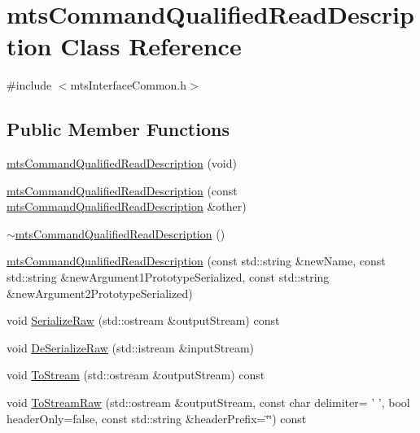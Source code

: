 \hypertarget{classmts_command_qualified_read_description}{\section{mts\-Command\-Qualified\-Read\-Description Class Reference}
\label{classmts_command_qualified_read_description}
}


{\ttfamily \#include $<$mts\-Interface\-Common.\-h$>$}

\subsection*{Public Member Functions}
\begin{DoxyCompactItemize}
\item 
\hyperlink{classmts_command_qualified_read_description_ac1bbc0907aacbcba29c705be7a3d6040}{mts\-Command\-Qualified\-Read\-Description} (void)
\item 
\hyperlink{classmts_command_qualified_read_description_aa84e9217fd8e3ae9293a86a5f10e7024}{mts\-Command\-Qualified\-Read\-Description} (const \hyperlink{classmts_command_qualified_read_description}{mts\-Command\-Qualified\-Read\-Description} \&other)
\item 
\hyperlink{classmts_command_qualified_read_description_abe7e0823d8277340b167b1c621155b8e}{$\sim$mts\-Command\-Qualified\-Read\-Description} ()
\item 
\hyperlink{classmts_command_qualified_read_description_a85a636e73cab699ebbcea28f5cfc9785}{mts\-Command\-Qualified\-Read\-Description} (const std\-::string \&new\-Name, const std\-::string \&new\-Argument1\-Prototype\-Serialized, const std\-::string \&new\-Argument2\-Prototype\-Serialized)
\item 
void \hyperlink{classmts_command_qualified_read_description_a403bc9b1f46e8d1517816735827b578b}{Serialize\-Raw} (std\-::ostream \&output\-Stream) const 
\item 
void \hyperlink{classmts_command_qualified_read_description_adf580fad2322e0a485068c3c05f2d361}{De\-Serialize\-Raw} (std\-::istream \&input\-Stream)
\item 
void \hyperlink{classmts_command_qualified_read_description_a2f6c61427eefc5cd06173ddd7d751b7c}{To\-Stream} (std\-::ostream \&output\-Stream) const 
\item 
void \hyperlink{classmts_command_qualified_read_description_ab656606931b354eb29b6fc592211aca8}{To\-Stream\-Raw} (std\-::ostream \&output\-Stream, const char delimiter= ' ', bool header\-Only=false, const std\-::string \&header\-Prefix=\char`\"{}\char`\"{}) const 

\end{DoxyCompactItemize}
